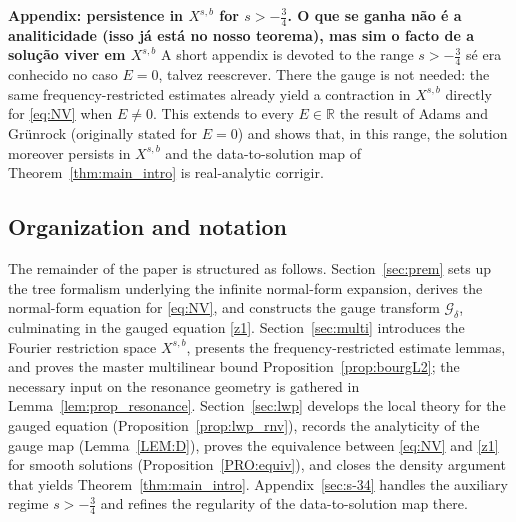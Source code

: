 \documentclass[a4paper,
11pt,  reqno]{amsart}
\newcommand{\blue}{\color{blue}}
\newcommand{\orange}{\color{orange}}
\newcommand{\5}{\textup{V}}
\theoremstyle{remark}
\newcommand{\R}{\mathbb{R}}
\newcommand{\Gc}{\mathcal{G}}
\numberwithin{equation}{section}
\numberwithin{theorem}{section}
\begin{document}
\medskip

\textbf{Appendix: {\orange persistence in $X^{s,b}$ for $s>-\tfrac34$}. {\blue O que se ganha não é a analiticidade (isso já está no nosso teorema), mas sim o facto de a solução viver em $X^{s,b}$}}
A short appendix is devoted to the {\orange range $s>-\tfrac34$} {\blue sé era conhecido no caso $E=0$, talvez reescrever}. There the gauge is not needed: the same frequency-restricted estimates already yield a contraction in $X^{s,b}$ directly for \eqref{eq:NV} when $E\neq 0$. {\orange This extends to every $E\in\R$ the result of Adams and Gr\"unrock \cite{adamsgrunrock} (originally stated for $E=0$) and shows that, in this range, the solution moreover persists in $X^{s,b}$ and the data-to-solution map of Theorem~\ref{thm:main_intro} is real-analytic} {\blue corrigir}.

\medskip


\subsection{Organization and notation}

The remainder of the paper is structured as follows. Section~\ref{sec:prem} sets up the tree formalism underlying the infinite normal-form expansion, derives the normal-form equation for \eqref{eq:NV}, and constructs the gauge transform $\Gc_\delta$, culminating in the gauged equation \eqref{z1}. Section~\ref{sec:multi} introduces the Fourier restriction space $X^{s,b}$, presents the frequency-restricted estimate lemmas, and proves the master multilinear bound Proposition~\ref{prop:bourgL2}; the necessary input on the resonance geometry is gathered in Lemma~\ref{lem:prop_resonance}. Section~\ref{sec:lwp} develops the local theory for the gauged equation (Proposition~\ref{prop:lwp_rnv}), records the analyticity of the gauge map (Lemma~\ref{LEM:D}), proves the equivalence between \eqref{eq:NV} and \eqref{z1} for smooth solutions (Proposition~\ref{PRO:equiv}), and closes the density argument that yields Theorem~\ref{thm:main_intro}. Appendix~\ref{sec:s-34} handles the auxiliary regime $s>-\tfrac34$ and refines the regularity of the data-to-solution map there.

\bigskip
\end{document}
